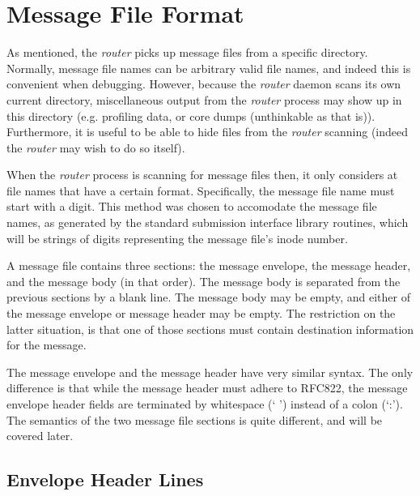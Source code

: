 
\section{Message File Format}
\label{msg_file_format}

As mentioned, the {\em router\/} picks up message files from a specific directory.
Normally, message file names can be arbitrary valid file names, and indeed
this is convenient when debugging.  However, because the {\em router\/} daemon
scans its own current directory, miscellaneous output from the {\em router\/}
process may show up in this directory (e.g. profiling data, or core dumps
(unthinkable as that is)).  Furthermore, it is useful to be able to hide
files from the {\em router\/} scanning (indeed the {\em router\/} may wish to do so
itself).

When the {\em router\/} process is scanning for message files then, it only
considers at file names that have a certain format.  Specifically, the
message file name must start with a digit.  This method was chosen to
accomodate the message file names, as generated by the standard submission
interface library routines, which will be strings of digits representing
the message file's inode number.

A message file contains three sections: the message envelope, the message
header, and the message body (in that order).  The message body is
separated from the previous sections by a blank line.  The message body may
be empty, and either of the message envelope or message header may be
empty.  The restriction on the latter situation, is that one of those
sections must contain destination information for the message.

The message envelope and the message header have very similar syntax.  The
only difference is that while the message header must adhere to RFC822, the
message envelope header fields are terminated by whitespace (` ') instead
of a colon (`:').  The semantics of the two message file sections is quite
different, and will be covered later.




\subsection{Envelope Header Lines}



